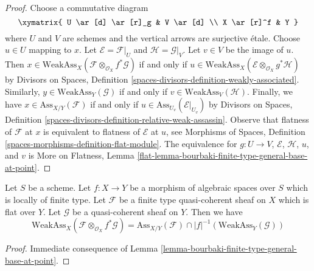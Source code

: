 \begin{proof}
Choose a commutative diagram
$$
\xymatrix{
U \ar[d] \ar[r]_g & V \ar[d] \\
X \ar[r]^f & Y
}
$$
where $U$ and $V$ are schemes and the vertical arrows are surjective \'etale.
Choose $u \in U$ mapping to $x$. Let $\mathcal{E} = \mathcal{F}|_U$
and $\mathcal{H} = \mathcal{G}|_V$.
Let $v \in V$ be the image of $u$. Then
$x \in \text{WeakAss}_X(\mathcal{F} \otimes_{\mathcal{O}_X} f^*\mathcal{G})$
if and only if
$u \in \text{WeakAss}_X(\mathcal{E} \otimes_{\mathcal{O}_X} g^*\mathcal{H})$
by Divisors on Spaces, Definition
\ref{spaces-divisors-definition-weakly-associated}.
Similarly, $y \in \text{WeakAss}_Y(\mathcal{G})$ if and only if
$v \in \text{WeakAss}_V(\mathcal{H})$.
Finally, we have $x \in \text{Ass}_{X/Y}(\mathcal{F})$ if and only if
$u \in \text{Ass}_{U_v}(\mathcal{E}|_{U_v})$ by
Divisors on Spaces, Definition
\ref{spaces-divisors-definition-relative-weak-assassin}.
Observe that flatness of $\mathcal{F}$ at $x$ is
equivalent to flatness of $\mathcal{E}$ at $u$, see
Morphisms of Spaces, Definition \ref{spaces-morphisms-definition-flat-module}.
The equivalence for $g : U \to V$, $\mathcal{E}$, $\mathcal{H}$, $u$, and $v$
is More on Flatness, Lemma
\ref{flat-lemma-bourbaki-finite-type-general-base-at-point}.
\end{proof}

\begin{lemma}
\label{lemma-bourbaki-finite-type-general-base}
Let $S$ be a scheme. Let $f : X \to Y$ be a morphism of algebraic spaces
over $S$ which is locally of finite type.
Let $\mathcal{F}$ be a finite type quasi-coherent sheaf on $X$
which is flat over $Y$. Let $\mathcal{G}$ be a quasi-coherent sheaf on $Y$.
Then we have
$$
\text{WeakAss}_X(\mathcal{F} \otimes_{\mathcal{O}_X} f^*\mathcal{G}) =
\text{Ass}_{X/Y}(\mathcal{F}) \cap
|f|^{-1}(\text{WeakAss}_Y(\mathcal{G}))
$$
\end{lemma}

\begin{proof}
Immediate consequence of
Lemma \ref{lemma-bourbaki-finite-type-general-base-at-point}.
\end{proof}

